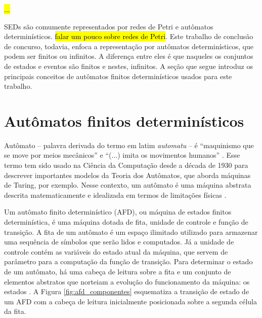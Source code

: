 \hl{...}

SEDs são comumente representados por redes de Petri e autômatos determinísticos. \hl{falar um pouco sobre redes de Petri}. Este trabalho de conclusão de concurso, todavia, enfoca a representação por autômatos determinísticos, que podem ser finitos ou infinitos. A diferença entre eles é que naqueles os conjuntos de estados e eventos são finitos e nestes, infinitos. A seção que segue introduz os principais conceitos de autômatos finitos determinísticos usados para este trabalho.

\section{Autômatos finitos determinísticos}

Autômato -- palavra derivada do termo em latim \textit{automatu} -- é ``maquinismo que se move por meios mecânicos'' e ``(...) imita os movimentos humanos'' \cite[p. 81]{aurelio}. Esse termo tem sido usado na Ciência da Computação desde a década de 1930 para descrever importantes modelos da Teoria dos Autômatos, que aborda máquinas de Turing, por exemplo. Nesse contexto, um autômato é uma máquina abstrata descrita matematicamente e idealizada em termos de limitações físicas \cite{hopcroft}.

Um autômato finito determinístico (\acs{AFD}), ou máquina de estados finitos determinística, é uma máquina dotada de fita, unidade de controle e função de transição. A fita de um autômato é um espaço ilimitado utilizado para armazenar uma sequência de símbolos que serão lidos e computados. Já a unidade de controle contém as variáveis do estado atual da máquina, que servem de parâmetro para a computação da função de transição. Para determinar o estado de um autômato, há uma cabeça de leitura sobre a fita e um conjunto de elementos abstratos que norteiam a evolução do funcionamento da máquina: os estados \cite{hopcroft}. A Figura \ref{fig:afd_componentes} esquematiza a transição de estado de um AFD com a cabeça de leitura inicialmente posicionada sobre a segunda célula da fita.

